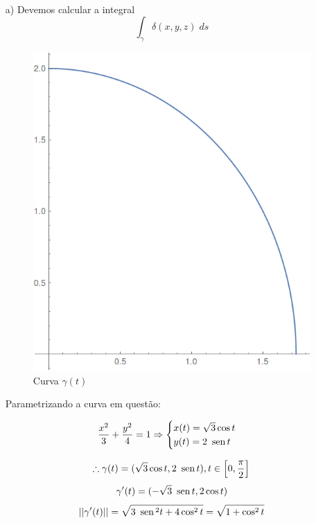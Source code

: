 \documentclass[12pt,a4paper]{article}
\newcommand{\sen}{\mbox{\, sen}\,}
\begin{document}
 \\

\begin{itemize}
\item[a)]
Devemos calcular a integral
$$  \int_{\gamma}{\delta(x,y,z)}\;ds $$

\begin{figure}[H]
	\centering
	\includegraphics[scale=0.2]{Fig2a.png}  
	\caption{Curva $\gamma(t)$}
	\label{fig:figura2a}
\end{figure}

Parametrizando a curva em questão:

$$
\frac{x^2}{3} + \frac{y^2}{4} = 1
\Rightarrow
\begin{cases}
x(t) = \sqrt{3}\cos t \\
y(t) = 2\sen t\\
\end{cases}
$$

$$ \therefore \gamma(t) = (\sqrt{3}\cos t, 2\sen t), t \in \Big[0,\frac{\pi}{2}\Big] $$
$$ \gamma'(t) = (-\sqrt{3}\sen t, 2\cos t) $$
$$ ||\gamma'(t)|| = \sqrt{3\sen^2 t + 4\cos^2 t} = \sqrt{1 + \cos^2 t} $$


\end{itemize}
\end{document}
